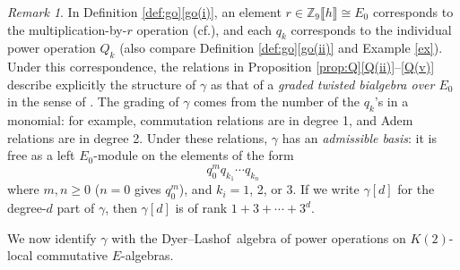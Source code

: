 \documentclass{gtpart}
\theoremstyle{definition}
\theoremstyle{remark}
\newtheorem{rmk}[thm]{Remark}
\newcommand{\mb}[1]{\mathbb{#1}}
\newcommand{\cf}{cf.\thinspace}
\newcommand{\DL}{Dyer--Lashof~}
\newcommand{\BZ}{{\mb Z}}
\newcommand{\g}{\gamma}
\newcommand{\q}[1]{Proposition \ref{prop:Q}\thinspace \eqref{Q(#1)}}
\newcommand{\go}[1]{Definition \ref{def:go}\thinspace \eqref{go(#1)}}
\begin{document}
\begin{rmk}
\label{rmk:rank}
 In \go{i}, an element $r \in \BZ_9 \llbracket h \rrbracket \cong E_0$ 
 corresponds to the multiplication-by-$r$ operation (\cf \cite[Proposition 6.4]{cong}), 
 and each $q_k$ corresponds to the individual power operation $Q_k$ (also compare \go{ii} and Example \ref{ex}).  
 Under this correspondence, the relations in \q{ii}--\eqref{Q(v)}  describe explicitly the structure of $\g$ as 
 that of a {\em graded twisted bialgebra over $E_0$} in the sense of \cite[Section 5]{cong}.  
 The grading of $\g$ comes from the number of the $q_k$'s in a monomial: for example, commutation relations are in degree 1, and Adem relations are in degree 2.  
 Under these relations, $\g$ has an {\em admissible basis}: it is free as a left $E_0$-module on the elements of the form 
 \[
  q_0^m q_{k_1} \cdots q_{k_n} 
 \]
 where $m, n \geq 0$ ($n = 0$ gives $q_0^m$), and $k_i = 1$, 2, or 3.  
 If we write $\g[d]$ for the degree-$d$ part of $\g$, then $\g[d]$ is of rank $1 + 3 + \cdots + 3^d$.  
\end{rmk}

We now identify $\g$ with the \DL algebra of power operations on $K(2)$-local commutative $E$-algebras.  
\end{document}
